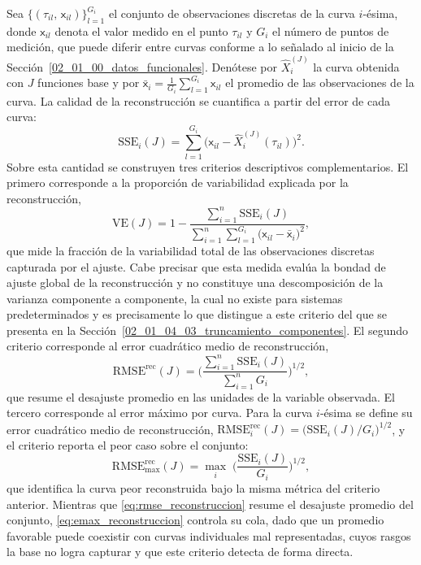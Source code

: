 Sea $\{(\tau_{il},\, \mathsf{x}_{il})\}_{l=1}^{G_i}$ el conjunto de observaciones discretas de la curva $i$-ésima, donde $\mathsf{x}_{il}$ denota el valor medido en el punto $\tau_{il}$ y $G_i$ el número de puntos de medición, que puede diferir entre curvas conforme a lo señalado al inicio de la Sección~\ref{02_01_00_datos_funcionales}. Denótese por $\widehat{X}_i^{(J)}$ la curva obtenida con $J$ funciones base y por $\bar{\mathsf{x}}_i = \frac{1}{G_i}\sum_{l=1}^{G_i} \mathsf{x}_{il}$ el promedio de las observaciones de la curva. La calidad de la reconstrucción se cuantifica a partir del error de cada curva:
\begin{equation}\label{eq:sse_curva}
    \mathrm{SSE}_i(J) = \sum_{l=1}^{G_i}
    \bigl(\mathsf{x}_{il} - \widehat{X}_i^{(J)}(\tau_{il})\bigr)^2.
\end{equation}
Sobre esta cantidad se construyen tres criterios descriptivos complementarios. El primero corresponde a la proporción de variabilidad explicada por la reconstrucción,
\begin{equation}\label{eq:ve_reconstruccion}
    \mathrm{VE}(J) = 1 -
    \frac{\sum_{i=1}^{n}\mathrm{SSE}_i(J)}
    {\sum_{i=1}^{n}\sum_{l=1}^{G_i}\bigl(\mathsf{x}_{il} - \bar{\mathsf{x}}_i\bigr)^2},
\end{equation}
que mide la fracción de la variabilidad total de las observaciones discretas capturada por el ajuste. Cabe precisar que esta medida evalúa la bondad de ajuste global de la reconstrucción y no constituye una descomposición de la varianza componente a componente, la cual no existe para sistemas predeterminados y es precisamente lo que distingue a este criterio del que se presenta en la Sección~\ref{02_01_04_03_truncamiento_componentes}. El segundo criterio corresponde al error cuadrático medio de reconstrucción,
\begin{equation}\label{eq:rmse_reconstruccion}
    \mathrm{RMSE}^{\mathrm{rec}}(J) = \Biggl(
    \frac{\sum_{i=1}^{n}\mathrm{SSE}_i(J)}
    {\sum_{i=1}^{n} G_i}
    \Biggr)^{1/2},
\end{equation}
que resume el desajuste promedio en las unidades de la variable observada. El tercero corresponde al error máximo por curva. Para la curva $i$-ésima se define su error cuadrático medio de reconstrucción, $\mathrm{RMSE}^{\mathrm{rec}}_i(J) = \bigl(\mathrm{SSE}_i(J)/G_i\bigr)^{1/2}$, y el criterio reporta el peor caso sobre el conjunto:
\begin{equation}\label{eq:emax_reconstruccion}
    \mathrm{RMSE}^{\mathrm{rec}}_{\max}(J) = \max_{i}\;
    \Biggl(\frac{\mathrm{SSE}_i(J)}{G_i}\Biggr)^{1/2},
\end{equation}
que identifica la curva peor reconstruida bajo la misma métrica del criterio anterior. Mientras que \eqref{eq:rmse_reconstruccion} resume el desajuste promedio del conjunto, \eqref{eq:emax_reconstruccion} controla su cola, dado que un promedio favorable puede coexistir con curvas individuales mal representadas, cuyos rasgos la base no logra capturar y que este criterio detecta de forma directa.\\

